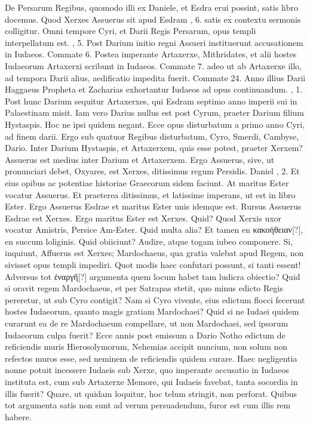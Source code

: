 De Persarum Regibus, quomodo illi ex Daniele,
 et Esdra erui possint,
satis libro  docemus.
Quod Xerxes Assuerus sit apud Esdram
, 6. satis ex contextu sermonis colligitur.
Omni tempore
Cyri, et Darii Regis Persarum, opus templi interpellatum est.
, 5.
Post Darium initio regni Assueri instituerunt accusationem
in Iudaeos.
Commate 6.
Postea imperante Artaxerxe, Mithridates,
et alii hostes Iudaeorum Artaxerxi scribunt in Iudaeos.
Commate 7.
adeo ut ab Artaxerxe illo, ad tempora Darii alius, aedificatio impedita
fuerit.
Commate 24.
Anno illius Darii Haggaeus Propheta
et Zacharias exhortantur Iudaeos ad opus continuandum.
, 1.
Post hunc Darium sequitur Artaxerxes, qui Esdram septimo anno
imperii sui in Palaestinam misit.
Iam vero Darius nullus est post Cyrum,
praeter Darium filium Hystaspis.
Hoc ne ipsi quidem negant.
Ecce opus disturbatum a primo anno Cyri, ad finem darii.
Ergo sub quatuor Regibus disturbatum, Cyro, Smerdi, Cambyse,
Dario.
Inter Darium Hystaspis, et Artaxerxem, quis esse potest,
praeter Xerxem?
Assuerus est medius inter Darium et Artaxerxem.
Ergo Assuerus, sive, ut pronunciari debet, Oxyares,
 est Xerxes, ditissimus
regum Persidis.
Daniel , 2.
Et eius opibus ac potentiae historiae
Graecorum sidem faciunt.
At maritus Ester vocatur Assuerus.
Et praeterea ditissimus, et latissime imperans, ut est in libro
Ester.
Ergo Assuerus Esdrae et maritus Ester unis idemque est.
Rursus Assuerus Esdrae est Xerxes.
Ergo maritus Ester est Xerxes.
Quid?
Quod Xerxis uxor vocatur Amistris, Persice Am-Ester.
Quid multa alia?
Et tamen en \textgreek{κακοήθειαν[?]}, en succum loliginis.
Quid obiiciunt?
Audire, atque togam iubeo componere.
Si, inquiunt, Affuerus est Xerxes;
Mardochaeus, qua gratia valebat apud Regem, non sivisset opus
templi impediri.
Quot modis haec confutari possunt, si tanti essent!
Adversus tot \textgreek{ἐναργῆ[?]} argumenta quem locum
 habet tam ludicra obiectio?
Quid si oravit regem Mardochaeus, et per Satrapas stetit, quo
minus edicto Regis pereretur, ut sub Cyro contigit?
Nam si Cyro vivente,
eius edictum flocci fecerunt hostes Iudaeorum, quanto magis
gratiam Mardochaei?
Quid si ne Iudaei quidem curarunt ea de re Mardochaeum
compellare, ut non Mardochaei, sed ipsorum Iudaeorum
culpa fuerit?
Ecce  annis post emissum a Dario Notho edictum
de reficiendis muris Hierosolymorum, Nehemias accipit nuncium,
non solum non refectos muros esse, sed neminem de reficiendis
quidem curare.
Haec negligentia nonne potuit incessere Iudaeis sub
Xerxe, quo imperante accusatio in Iudaeos instituta est, cum sub Artaxerxe
Memore, qui Iudaeis favebat, tanta socordia in illis fuerit?
Quare, ut quidam loquitur, hoc telum stringit, non perforat.
Quibus tot argumenta satis non sunt ad verum persuadendum, furor est
cum illis rem habere.

